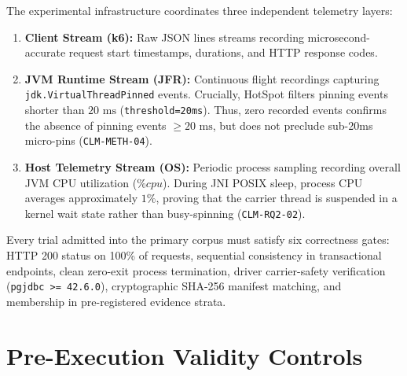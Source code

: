 The experimental infrastructure coordinates three independent telemetry layers:
\begin{enumerate}
  \item \textbf{Client Stream (k6):} Raw JSON lines streams recording microsecond-accurate request start timestamps, durations, and HTTP response codes.
  \item \textbf{JVM Runtime Stream (JFR):} Continuous flight recordings capturing \texttt{jdk.VirtualThreadPinned} events. Crucially, HotSpot filters pinning events shorter than $20\text{ ms}$ (\texttt{threshold=20ms}). Thus, zero recorded events confirms the absence of pinning events $\ge 20\text{ ms}$, but does not preclude sub-20ms micro-pins (\texttt{CLM-METH-04}).
  \item \textbf{Host Telemetry Stream (OS):} Periodic process sampling recording overall JVM CPU utilization ($\%cpu$). During JNI POSIX sleep, process CPU averages approximately $1\%$, proving that the carrier thread is suspended in a kernel wait state rather than busy-spinning (\texttt{CLM-RQ2-02}).
\end{enumerate}

Every trial admitted into the primary corpus must satisfy six correctness gates: HTTP 200 status on 100\% of requests, sequential consistency in transactional endpoints, clean zero-exit process termination, driver carrier-safety verification (\texttt{pgjdbc >= 42.6.0}), cryptographic SHA-256 manifest matching, and membership in pre-registered evidence strata.

\section{Pre-Execution Validity Controls}
\label{sec:validity-controls}

